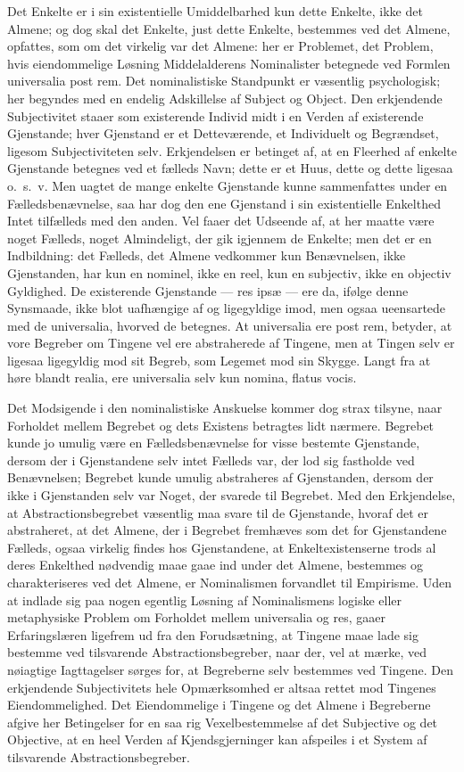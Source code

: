 \documentclass[12pt]{book}
\newcommand{\opage}[1]{\marginnote{\footnotesize\textit{[#1]}}}
\begin{document}
Det Enkelte er i sin existentielle Umiddelbarhed kun dette Enkelte, ikke det Almene; og dog skal
det Enkelte, just dette Enkelte, bestemmes ved det Almene, opfattes, som om det virkelig var det
Almene: her er Problemet, det Problem, hvis eiendommelige Løsning Middelalderens Nominalister
betegnede ved Formlen universalia post rem. Det nominalistiske Standpunkt er væsentlig
psychologisk; her begyndes med en endelig Adskillelse af Subject og Object. Den erkjendende
Subjectivitet staaer som existerende Individ midt i en Verden af existerende Gjenstande; hver
Gjenstand er et Detteværende, et Individuelt og Begrændset, ligesom Subjectiviteten selv.
\opage{194} Erkjendelsen er betinget af, at en Fleerhed af enkelte Gjenstande betegnes ved et fælleds Navn;
dette er et Huus, dette og dette ligesaa o.\ s.\ v. Men uagtet de mange enkelte Gjenstande kunne
sammenfattes under en Fælledsbenævnelse, saa har dog den ene Gjenstand i sin existentielle
Enkelthed Intet tilfælleds med den anden. Vel faaer det Udseende af, at her maatte være noget
Fælleds, noget Almindeligt, der gik igjennem de Enkelte; men det er en Indbildning: det Fælleds,
det Almene vedkommer kun Benævnelsen, ikke Gjenstanden, har kun en nominel, ikke en reel, kun en
subjectiv, ikke en objectiv Gyldighed. De existerende Gjenstande --- res ipsæ --- ere da, ifølge
denne Synsmaade, ikke blot uafhængige af og ligegyldige imod, men ogsaa ueensartede med de
universalia, hvorved de betegnes. At universalia ere post rem, betyder, at vore Begreber om
Tingene vel ere abstraherede af Tingene, men at Tingen selv er ligesaa ligegyldig mod sit Begreb,
som Legemet mod sin Skygge. Langt fra at høre blandt realia, ere universalia selv kun nomina,
flatus vocis.

Det Modsigende i den nominalistiske Anskuelse kommer dog strax tilsyne, naar Forholdet mellem
Begrebet og dets Existens betragtes lidt nærmere. Begrebet kunde jo umulig være en
Fælledsbenævnelse for visse bestemte Gjenstande, dersom der i Gjenstandene selv intet Fælleds var,
der lod sig fastholde ved Benævnelsen; Begrebet kunde umulig abstraheres af Gjenstanden, dersom
der ikke i Gjenstanden selv var Noget, der svarede til Begrebet. Med den Erkjendelse, at
Abstractionsbegrebet væsentlig maa svare til de Gjenstande, hvoraf det er abstraheret, at det
Almene, der i Begrebet fremhæves som det for Gjenstandene Fælleds, ogsaa virkelig findes hos
Gjenstandene, at Enkeltexistenserne trods al deres Enkelthed nødvendig maae gaae ind under det
Almene, bestemmes og charakteriseres ved det Almene, er Nominalismen forvandlet til Empirisme.
\opage{195} Uden at indlade sig paa nogen egentlig Løsning af Nominalismens logiske eller metaphysiske Problem
om Forholdet mellem universalia og res, gaaer Erfaringslæren ligefrem ud fra den Forudsætning, at
Tingene maae lade sig bestemme ved tilsvarende Abstractionsbegreber, naar der, vel at mærke, ved
nøiagtige Iagttagelser sørges for, at Begreberne selv bestemmes ved Tingene. Den erkjendende
Subjectivitets hele Opmærksomhed er altsaa rettet mod Tingenes Eiendommelighed. Det Eiendommelige
i Tingene og det Almene i Begreberne afgive her Betingelser for en saa rig Vexelbestemmelse af det
Subjective og det Objective, at en heel Verden af Kjendsgjerninger kan afspeiles i et System af
tilsvarende Abstractionsbegreber.
\end{document}
